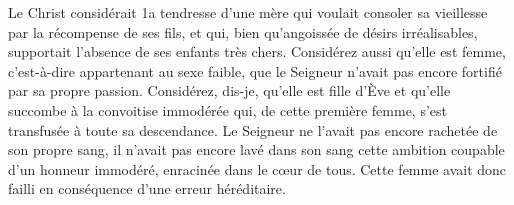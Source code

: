 Le Christ considérait 1a tendresse d’une mère
	qui voulait consoler sa vieillesse par la récompense de ses fils,
	et qui, bien qu’angoissée de désirs irréalisables,
	supportait l’absence de ses enfants très chers.
Considérez aussi qu’elle est femme, c’est-à-dire appartenant au sexe faible,
	que le Seigneur n’avait pas encore fortifié par sa propre passion.
Considérez, dis-je, qu’elle est fille d’Ève
	et qu’elle succombe à la convoitise immodérée qui, de cette première femme,
	s’est transfusée à toute sa descendance.
Le Seigneur ne l’avait pas encore rachetée de son propre sang,
	il n’avait pas encore lavé dans son sang
		cette ambition coupable d’un honneur immodéré,
	enracinée dans le cœur de tous.
Cette femme avait donc failli en conséquence d’une erreur héréditaire.

